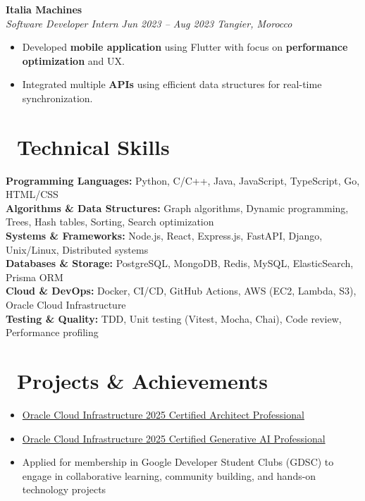 \documentclass[a4paper, 10pt]{article}
\begin{document}
\textbf{Italia Machines} \\
\textit{Software Developer Intern} \hfill \textit{Jun 2023 -- Aug 2023 \textbar{} Tangier, Morocco}
\begin{itemize}[leftmargin=10pt, itemsep=-1pt, topsep=2pt]
\item Developed \textbf{mobile application} using Flutter with focus on \textbf{performance optimization} and UX.
\item Integrated multiple \textbf{APIs} using efficient data structures for real-time synchronization.
\end{itemize}

\section{\faBrain\ Technical Skills}
\textbf{Programming Languages:} Python, C/C++, Java, JavaScript, TypeScript, Go, HTML/CSS \\
\textbf{Algorithms \& Data Structures:} Graph algorithms, Dynamic programming, Trees, Hash tables, Sorting, Search optimization \\
\textbf{Systems \& Frameworks:} Node.js, React, Express.js, FastAPI, Django, Unix/Linux, Distributed systems \\
\textbf{Databases \& Storage:} PostgreSQL, MongoDB, Redis, MySQL, ElasticSearch, Prisma ORM \\
\textbf{Cloud \& DevOps:} Docker, CI/CD, GitHub Actions, AWS (EC2, Lambda, S3), Oracle Cloud Infrastructure \\
\textbf{Testing \& Quality:} TDD, Unit testing (Vitest, Mocha, Chai), Code review, Performance profiling

\section{\faCode\ Projects \& Achievements}

\begin{itemize}[leftmargin=10pt, itemsep=-1pt, topsep=2pt]
\item \href{https://catalog-education.oracle.com/ords/certview/sharebadge?id=6ED86FBEB704E80D6E9BC8B80AF40836F447C3EC75A5E8661AF34FC0AFFF04E5}{Oracle Cloud Infrastructure 2025 Certified Architect Professional} {\scriptsize\textcolor{gray}{\faExternalLink}}
\item \href{https://catalog-education.oracle.com/ords/certview/sharebadge?id=7AEC49B8C2627C38749A181392EFCD096F2A92E136E653876CA336B24BF52232}{Oracle Cloud Infrastructure 2025 Certified Generative AI Professional} {\scriptsize\textcolor{gray}{\faExternalLink}}
\item Applied for membership in Google Developer Student Clubs (GDSC) to engage in collaborative learning, community building, and hands-on technology projects
\end{itemize}
\end{document}
